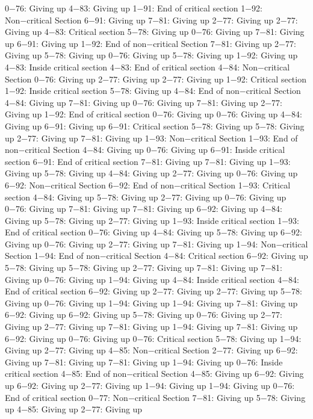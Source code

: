 0−76: Giving up
4−83: Giving up
1−91: End of critical section
1−92: Non−critical Section
6−91: Giving up
7−81: Giving up
2−77: Giving up
2−77: Giving up
4−83: Critical section
5−78: Giving up
0−76: Giving up
7−81: Giving up
6−91: Giving up
1−92: End of non−critical Section
7−81: Giving up
2−77: Giving up
5−78: Giving up
0−76: Giving up
5−78: Giving up
1−92: Giving up
4−83: Inside critical section
4−83: End of critical section
4−84: Non−critical Section
0−76: Giving up
2−77: Giving up
2−77: Giving up
1−92: Critical section
1−92: Inside critical section
5−78: Giving up
4−84: End of non−critical Section
4−84: Giving up
7−81: Giving up
0−76: Giving up
7−81: Giving up
2−77: Giving up
1−92: End of critical section
0−76: Giving up
0−76: Giving up
4−84: Giving up
6−91: Giving up
6−91: Critical section
5−78: Giving up
5−78: Giving up
2−77: Giving up
7−81: Giving up
1−93: Non−critical Section
1−93: End of non−critical Section
4−84: Giving up
0−76: Giving up
6−91: Inside critical section
6−91: End of critical section
7−81: Giving up
7−81: Giving up
1−93: Giving up
5−78: Giving up
4−84: Giving up
2−77: Giving up
0−76: Giving up
6−92: Non−critical Section
6−92: End of non−critical Section
1−93: Critical section
4−84: Giving up
5−78: Giving up
2−77: Giving up
0−76: Giving up
0−76: Giving up
7−81: Giving up
7−81: Giving up
6−92: Giving up
4−84: Giving up
5−78: Giving up
2−77: Giving up
1−93: Inside critical section
1−93: End of critical section
0−76: Giving up
4−84: Giving up
5−78: Giving up
6−92: Giving up
0−76: Giving up
2−77: Giving up
7−81: Giving up
1−94: Non−critical Section
1−94: End of non−critical Section
4−84: Critical section
6−92: Giving up
5−78: Giving up
5−78: Giving up
2−77: Giving up
7−81: Giving up
7−81: Giving up
0−76: Giving up
1−94: Giving up
4−84: Inside critical section
4−84: End of critical section
6−92: Giving up
2−77: Giving up
2−77: Giving up
5−78: Giving up
0−76: Giving up
1−94: Giving up
1−94: Giving up
7−81: Giving up
6−92: Giving up
6−92: Giving up
5−78: Giving up
0−76: Giving up
2−77: Giving up
2−77: Giving up
7−81: Giving up
1−94: Giving up
7−81: Giving up
6−92: Giving up
0−76: Giving up
0−76: Critical section
5−78: Giving up
1−94: Giving up
2−77: Giving up
4−85: Non−critical Section
2−77: Giving up
6−92: Giving up
7−81: Giving up
7−81: Giving up
1−94: Giving up
0−76: Inside critical section
4−85: End of non−critical Section
4−85: Giving up
6−92: Giving up
6−92: Giving up
2−77: Giving up
1−94: Giving up
1−94: Giving up
0−76: End of critical section
0−77: Non−critical Section
7−81: Giving up
5−78: Giving up
4−85: Giving up
2−77: Giving up
